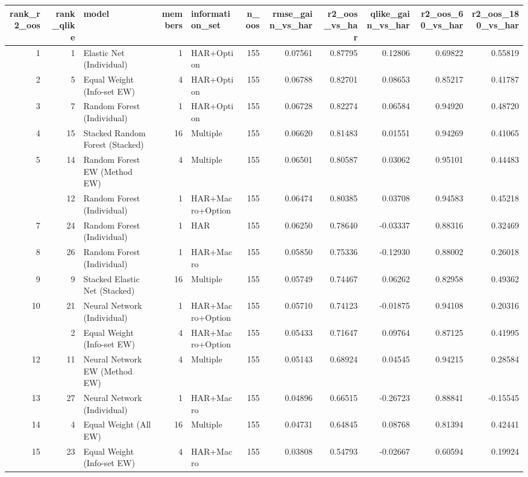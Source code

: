 
\begin{tabular}{rrlrlrrrrrr}
\toprule
rank\_r2\_oos & rank\_qlike & model & members & information\_set & n\_oos & rmse\_gain\_vs\_har & r2\_oos\_vs\_har & qlike\_gain\_vs\_har & r2\_oos\_60\_vs\_har & r2\_oos\_180\_vs\_har\\
\midrule
1 & 1 & Elastic Net (Individual) & 1 & HAR+Option & 155 & 0.07561 & 0.87795 & 0.12806 & 0.69822 & 0.55819\\
2 & 5 & Equal Weight (Info-set EW) & 4 & HAR+Option & 155 & 0.06788 & 0.82701 & 0.08653 & 0.85217 & 0.41787\\
3 & 7 & Random Forest (Individual) & 1 & HAR+Option & 155 & 0.06728 & 0.82274 & 0.06584 & 0.94920 & 0.48720\\
4 & 15 & Stacked Random Forest (Stacked) & 16 & Multiple & 155 & 0.06620 & 0.81483 & 0.01551 & 0.94269 & 0.41065\\
5 & 14 & Random Forest EW (Method EW) & 4 & Multiple & 155 & 0.06501 & 0.80587 & 0.03062 & 0.95101 & 0.44483\\
\addlinespace
6 & 12 & Random Forest (Individual) & 1 & HAR+Macro+Option & 155 & 0.06474 & 0.80385 & 0.03708 & 0.94583 & 0.45218\\
7 & 24 & Random Forest (Individual) & 1 & HAR & 155 & 0.06250 & 0.78640 & -0.03337 & 0.88316 & 0.32469\\
8 & 26 & Random Forest (Individual) & 1 & HAR+Macro & 155 & 0.05850 & 0.75336 & -0.12930 & 0.88002 & 0.26018\\
9 & 9 & Stacked Elastic Net (Stacked) & 16 & Multiple & 155 & 0.05749 & 0.74467 & 0.06262 & 0.82958 & 0.49362\\
10 & 21 & Neural Network (Individual) & 1 & HAR+Macro+Option & 155 & 0.05710 & 0.74123 & -0.01875 & 0.94108 & 0.20316\\
\addlinespace
11 & 2 & Equal Weight (Info-set EW) & 4 & HAR+Macro+Option & 155 & 0.05433 & 0.71647 & 0.09764 & 0.87125 & 0.41995\\
12 & 11 & Neural Network EW (Method EW) & 4 & Multiple & 155 & 0.05143 & 0.68924 & 0.04545 & 0.94215 & 0.28584\\
13 & 27 & Neural Network (Individual) & 1 & HAR+Macro & 155 & 0.04896 & 0.66515 & -0.26723 & 0.88841 & -0.15545\\
14 & 4 & Equal Weight (All EW) & 16 & Multiple & 155 & 0.04731 & 0.64845 & 0.08768 & 0.81394 & 0.42441\\
15 & 23 & Equal Weight (Info-set EW) & 4 & HAR+Macro & 155 & 0.03808 & 0.54793 & -0.02667 & 0.60594 & 0.19924\\

\end{tabular}
